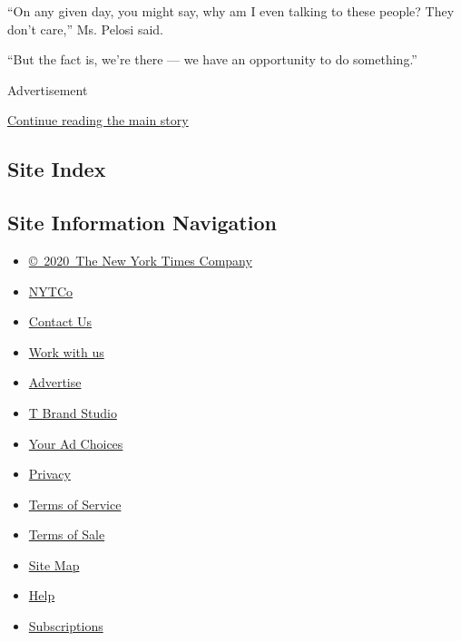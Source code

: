 ``On any given day, you might say, why am I even talking to these
people? They don't care,'' Ms. Pelosi said.

``But the fact is, we're there --- we have an opportunity to do
something.''

Advertisement

\protect\hyperlink{after-bottom}{Continue reading the main story}

\hypertarget{site-index}{%
\subsection{Site Index}\label{site-index}}

\hypertarget{site-information-navigation}{%
\subsection{Site Information
Navigation}\label{site-information-navigation}}

\begin{itemize}
\tightlist
\item
  \href{https://help.nytimes.com/hc/en-us/articles/115014792127-Copyright-notice}{©~2020~The
  New York Times Company}
\end{itemize}

\begin{itemize}
\tightlist
\item
  \href{https://www.nytco.com/}{NYTCo}
\item
  \href{https://help.nytimes.com/hc/en-us/articles/115015385887-Contact-Us}{Contact
  Us}
\item
  \href{https://www.nytco.com/careers/}{Work with us}
\item
  \href{https://nytmediakit.com/}{Advertise}
\item
  \href{http://www.tbrandstudio.com/}{T Brand Studio}
\item
  \href{https://www.nytimes.com/privacy/cookie-policy\#how-do-i-manage-trackers}{Your
  Ad Choices}
\item
  \href{https://www.nytimes.com/privacy}{Privacy}
\item
  \href{https://help.nytimes.com/hc/en-us/articles/115014893428-Terms-of-service}{Terms
  of Service}
\item
  \href{https://help.nytimes.com/hc/en-us/articles/115014893968-Terms-of-sale}{Terms
  of Sale}
\item
  \href{https://spiderbites.nytimes.com}{Site Map}
\item
  \href{https://help.nytimes.com/hc/en-us}{Help}
\item
  \href{https://www.nytimes.com/subscription?campaignId=37WXW}{Subscriptions}
\end{itemize}
